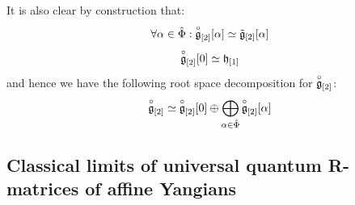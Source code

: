         \begin{remark}
            It is also clear by construction that:
                $$\forall \alpha \in \hat{\Phi}: \overset{\circ}{\mathfrak{g}}_{[2]}[\alpha] \simeq \tilde{\mathfrak{g}}_{[2]}[\alpha]$$
                $$\overset{\circ}{\mathfrak{g}}_{[2]}[0] \simeq \mathfrak{h}_{[1]}$$
            and hence we have the following root space decomposition for $\overset{\circ}{\mathfrak{g}}_{[2]}$:
                $$\overset{\circ}{\mathfrak{g}}_{[2]} \simeq \overset{\circ}{\mathfrak{g}}_{[2]}[0] \oplus \bigoplus_{\alpha \in \hat{\Phi}} \overset{\circ}{\mathfrak{g}}_{[2]}[\alpha]$$
        \end{remark}

    \subsection{Classical limits of universal quantum R-matrices of affine Yangians}